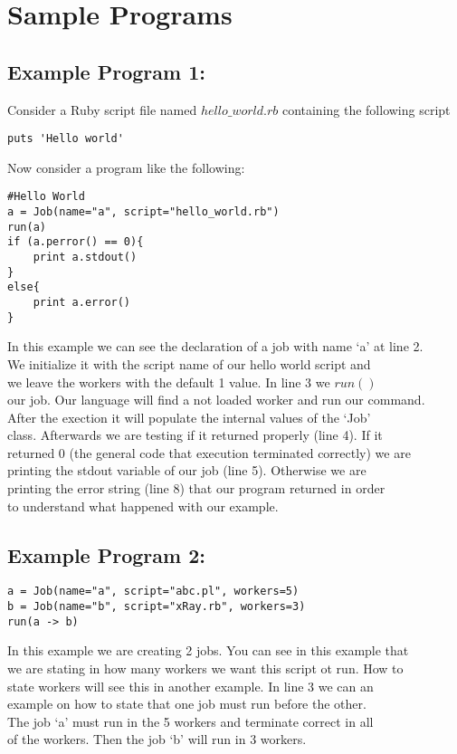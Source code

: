 \section{Sample Programs}
\label{sect:samples}
\subsection*{Example Program 1:}
Consider a Ruby script file named $hello\_world.rb$ containing the following script
\begin{verbatim}
puts 'Hello world'
\end{verbatim}
Now consider a \lang{} program like the following:
\begin{verbatim}
#Hello World
a = Job(name="a", script="hello_world.rb")
run(a)
if (a.perror() == 0){
    print a.stdout()
}
else{
    print a.error()
}
\end{verbatim}

In this example we can see the declaration of a job with name `a' at line 2.\\
We initialize it with the script name of our hello world script and\\
we leave the workers with the default 1 value. In line 3 we $run()$\\
our job. Our language will find a not loaded worker and run our command.\\
After the exection it will populate the internal values of the `Job'\\
class. Afterwards we are testing if it returned properly (line 4). If it\\
returned 0 (the general code that execution terminated correctly) we are\\
printing the stdout variable of our job (line 5). Otherwise we are\\
printing the error string (line 8) that our program returned in order\\
to understand what happened with our example.\\

\subsection*{Example Program 2:}
\begin{verbatim}
a = Job(name="a", script="abc.pl", workers=5)
b = Job(name="b", script="xRay.rb", workers=3)
run(a -> b)
\end{verbatim}

In this example we are creating 2 jobs. You can see in this example that\\
we are stating in how many workers we want this script ot run. How to \\
state workers will see this in another example. In line 3 we can an\\
example on how to state that one job must run before the other.\\
The job `a' must run in the 5 workers and terminate correct in all\\
of the workers. Then the job `b' will run in 3 workers.
\\

